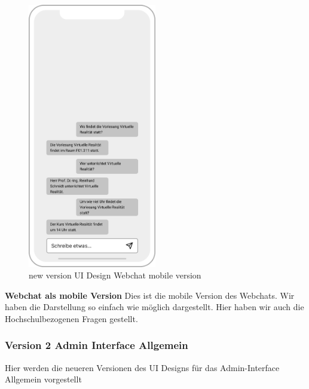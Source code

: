 \begin{figure}[H]
    \centering
    \includegraphics[width=0.5\textwidth]{bilder/new vers. UI Design/WebChat/mobile Version Webchat.png}
    \caption{new version UI Design Webchat mobile version}
    \label{fig:new version UI Design Webchat mobile version}
    \end{figure}
\noindent \textbf{Webchat als mobile Version} \newline
Dies ist die mobile Version des Webchats. Wir haben die Darstellung so einfach wie möglich dargestellt.
Hier haben wir auch die Hochschulbezogenen Fragen gestellt.

\newpage

\subsubsection{Version 2 Admin Interface Allgemein}
Hier werden die neueren Versionen des UI Designs für das Admin-Interface Allgemein vorgestellt

